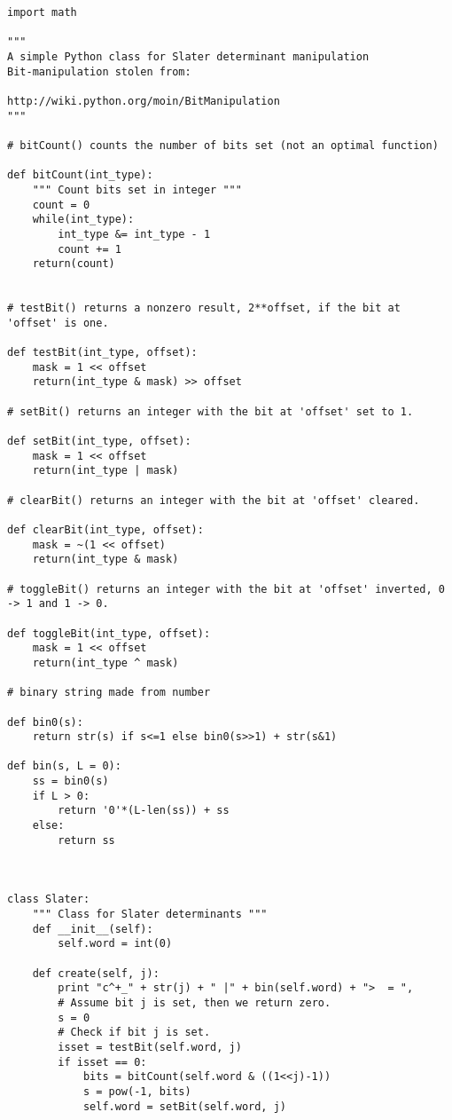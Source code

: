 \begin{verbatim}
import math

"""
A simple Python class for Slater determinant manipulation
Bit-manipulation stolen from:

http://wiki.python.org/moin/BitManipulation
"""

# bitCount() counts the number of bits set (not an optimal function)

def bitCount(int_type):
    """ Count bits set in integer """
    count = 0
    while(int_type):
        int_type &= int_type - 1
        count += 1
    return(count)


# testBit() returns a nonzero result, 2**offset, if the bit at 'offset' is one.

def testBit(int_type, offset):
    mask = 1 << offset
    return(int_type & mask) >> offset

# setBit() returns an integer with the bit at 'offset' set to 1.

def setBit(int_type, offset):
    mask = 1 << offset
    return(int_type | mask)

# clearBit() returns an integer with the bit at 'offset' cleared.

def clearBit(int_type, offset):
    mask = ~(1 << offset)
    return(int_type & mask)

# toggleBit() returns an integer with the bit at 'offset' inverted, 0 -> 1 and 1 -> 0.

def toggleBit(int_type, offset):
    mask = 1 << offset
    return(int_type ^ mask)

# binary string made from number

def bin0(s):
    return str(s) if s<=1 else bin0(s>>1) + str(s&1)

def bin(s, L = 0):
    ss = bin0(s)
    if L > 0:
        return '0'*(L-len(ss)) + ss
    else:
        return ss
    
    

class Slater:
    """ Class for Slater determinants """
    def __init__(self):
        self.word = int(0)

    def create(self, j):
        print "c^+_" + str(j) + " |" + bin(self.word) + ">  = ",
        # Assume bit j is set, then we return zero.
        s = 0
        # Check if bit j is set.
        isset = testBit(self.word, j)
        if isset == 0:
            bits = bitCount(self.word & ((1<<j)-1))
            s = pow(-1, bits)
            self.word = setBit(self.word, j)


\end{verbatim}

